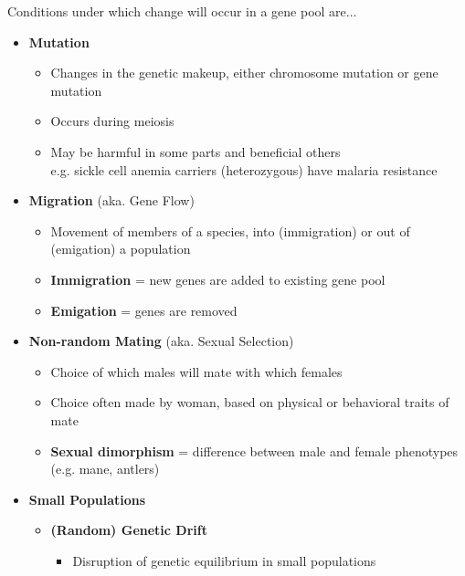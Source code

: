 \documentclass[a4paper,12pt]{article}
\begin{document}
Conditions under which change will occur in a gene pool are...
\begin{itemize}
    \item{
            \textbf{Mutation}
            \begin{itemize}
                \item{Changes in the genetic makeup, either chromosome mutation or gene mutation}
                \item{Occurs during meiosis}
                \item{May be harmful in some parts and beneficial others \\ e.g. sickle cell anemia carriers (heterozygous) have malaria resistance}
            \end{itemize}
        }

    \item{
            \textbf{Migration} (aka. Gene Flow)
            \begin{itemize}
                \item{Movement of members of a species, into (immigration) or out of (emigation) a population}
                \item{\textbf{Immigration} = new genes are added to existing gene pool}
                \item{\textbf{Emigation} = genes are removed}
            \end{itemize}
        }
    \item{
            \textbf{Non-random Mating} (aka. Sexual Selection)
            \begin{itemize}
                \item{Choice of which males will mate with which females}
                \item{Choice often made by woman, based on physical or behavioral traits of mate}
                \item{\textbf{Sexual dimorphism} = difference between male and female phenotypes (e.g. mane, antlers)}
            \end{itemize}
        }
    \item{
            \textbf{Small Populations}
            \begin{itemize}
                \item{
                        \textbf{(Random) Genetic Drift}
                        \begin{itemize}
                            \item{Disruption of genetic equilibrium in small populations}

\end{itemize}}
\end{itemize}}
\end{itemize}
\end{document}
